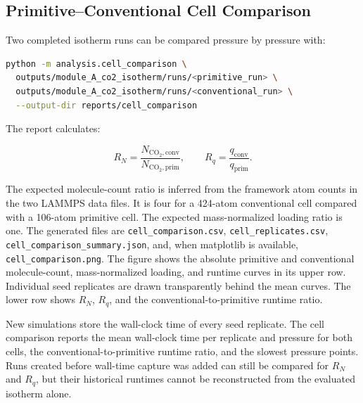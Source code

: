 \subsection{Primitive--Conventional Cell Comparison}

Two completed isotherm runs can be compared pressure by pressure with:

\begin{lstlisting}[language=bash]
python -m analysis.cell_comparison \
  outputs/module_A_co2_isotherm/runs/<primitive_run> \
  outputs/module_A_co2_isotherm/runs/<conventional_run> \
  --output-dir reports/cell_comparison
\end{lstlisting}

The report calculates:

\begin{equation}
    R_N =
    \frac{N_{\mathrm{CO_2,conv}}}{N_{\mathrm{CO_2,prim}}},
    \qquad
    R_q =
    \frac{q_{\mathrm{conv}}}{q_{\mathrm{prim}}}.
\end{equation}

The expected molecule-count ratio is inferred from the framework atom counts in
the two LAMMPS data files. It is four for a 424-atom conventional cell compared
with a 106-atom primitive cell. The expected mass-normalized loading ratio is
one. The generated files are \texttt{cell\_comparison.csv},
\texttt{cell\_replicates.csv}, \texttt{cell\_comparison\_summary.json}, and,
when matplotlib is available, \texttt{cell\_comparison.png}. The figure shows
the absolute primitive and conventional molecule-count, mass-normalized
loading, and runtime curves in its upper row. Individual seed replicates are
drawn transparently behind the mean curves. The lower row shows $R_N$, $R_q$,
and the conventional-to-primitive runtime ratio.

New simulations store the wall-clock time of every seed replicate. The cell
comparison reports the mean wall-clock time per replicate and pressure for both
cells, the conventional-to-primitive runtime ratio, and the slowest pressure
points. Runs created before wall-time capture was added can still be compared
for $R_N$ and $R_q$, but their historical runtimes cannot be reconstructed from
the evaluated isotherm alone.
